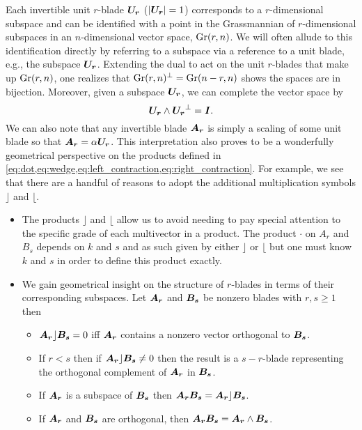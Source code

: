 Each invertible unit $r$-blade $\boldsymbol{U_r}$ ($|\boldsymbol{U_r}|=1$) corresponds to a $r$-dimensional subspace and can be identified with a point in the Grassmannian of $r$-dimensional subspaces in an $n$-dimensional vector space, $\operatorname{Gr}(r,n)$. We will often allude to this identification directly by referring to a subspace via a reference to a unit blade, e.g., the subspace $\boldsymbol{U_r}$. Extending the dual to act on the unit $r$-blades that make up $\operatorname{Gr}(r,n)$, one realizes that $\operatorname{Gr}(r,n)^\perp = \operatorname{Gr}(n-r,n)$ shows the spaces are in bijection. Moreover, given a subspace $\boldsymbol{U_r}$, we can complete the vector space by
\begin{equation}
\boldsymbol{U_r}\wedge \boldsymbol{U_r}^\perp = \boldsymbol{I}.
\end{equation} 
We can also note that any invertible blade $\boldsymbol{A_r}$ is simply a scaling of some unit blade so that $\boldsymbol{A_r} = \alpha \boldsymbol{U_r}$. This interpretation also proves to be a wonderfully geometrical perspective on the products defined in \cref{eq:dot,eq:wedge,eq:left_contraction,eq:right_contraction}. For example, we see that there are a handful of reasons to adopt the additional multiplication symbols $\rfloor$ and $\lfloor$. 
\begin{itemize}
    \item The products $\rfloor$ and $\lfloor$ allow us to avoid needing to pay special attention to the specific grade of each multivector in a product. The product $\cdot$ on $A_r$ and $B_s$ depends on $k$ and $s$ and as such given by either $\rfloor$ or $\lfloor$ but one must know $k$ and $s$ in order to define this product exactly. 
    \item We gain geometrical insight on the structure of $r$-blades in terms of their corresponding subspaces. Let $\boldsymbol{A_r}$ and $\boldsymbol{B_s}$ be nonzero blades with $r,s\geq 1$ then
    \begin{itemize}
        \item $\boldsymbol{A_r} \rfloor \boldsymbol{B_s} =0$ iff $\boldsymbol{A_r}$ contains a nonzero vector orthogonal to $\boldsymbol{B_s}$.
        \item If $r<s$ then if $\boldsymbol{A_r}\rfloor \boldsymbol{B_s} \neq 0$ then the result is a $s-r$-blade representing the orthogonal complement of $\boldsymbol{A_r}$ in $\boldsymbol{B_s}$.
        \item If $\boldsymbol{A_r}$ is a subspace of $\boldsymbol{B_s}$ then $\boldsymbol{A_r}\boldsymbol{B_s} = \boldsymbol{A_r}\rfloor \boldsymbol{B_s}$.
        \item If $\boldsymbol{A_r}$ and $\boldsymbol{B_s}$ are orthogonal, then $\boldsymbol{A_r}\boldsymbol{B_s} = \boldsymbol{A_r} \wedge \boldsymbol{B_s}$.
    \end{itemize}
\end{itemize}

